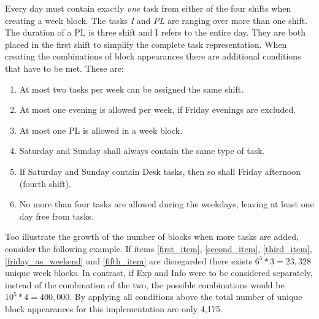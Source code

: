Every day must contain exactly \textit{one} task from either of the four shifts when creating a week block. The tasks \textit{I} and \textit{PL} are ranging over more than one shift. The duration of a PL is three shift and I refers to the entire day. They are both placed in the first shift to simplify the complete task representation. When creating the combinations of block appearances there are additional conditions that have to be met. These are:
\begin{enumerate}  
\item At most two tasks per week can be assigned the same shift.\label{first_item}
\item At most one evening is allowed per week, if Friday evenings are excluded. \label{second_item}
\item At most one PL is allowed in a week block. \label{third_item}
\item Saturday and Sunday shall always contain the same type of task.\label{fourth_item}
\item If Saturday and Sunday contain Desk tasks, then so shall Friday afternoon (fourth shift). \label{friday_as_weekend}
\item No more than four tasks are allowed during the weekdays, leaving at least one day free from tasks. \label{fifth_item}
\end{enumerate}

Too illustrate the growth of the number of blocks when more tasks are added, consider the following example. If items \ref{first_item}, \ref{second_item}, \ref{third_item}, \ref{friday_as_weekend} and \ref{fifth_item} are disregarded there exists $6^5*3 = 23,328$ unique week blocks. In contrast, if Exp and Info were to be considered separately, instead of the combination of the two, the possible combinations would be $10^5*4 = 400,000$.  By applying all conditions above the total number of unique block appearances for this implementation are only 4,175. 


